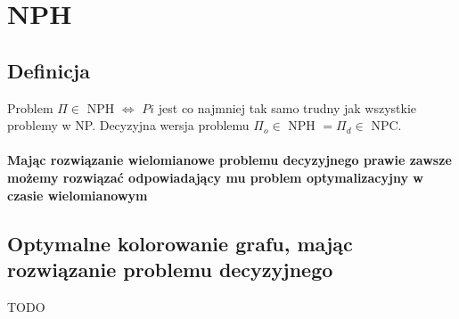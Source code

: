\documentclass{article}
\begin{document}
\section{NPH}
\subsection{Definicja}
Problem $\Pi \in$ NPH $\iff$ $Pi$ jest co najmniej tak samo trudny jak wszystkie problemy w NP.
Decyzyjna wersja problemu $\Pi_o \in$ NPH $= \Pi_d \in$ NPC.  \\\\
\textbf{Mając rozwiązanie wielomianowe problemu decyzyjnego prawie zawsze możemy
rozwiązać odpowiadający mu problem optymalizacyjny w czasie wielomianowym}

\subsection{Optymalne kolorowanie grafu, mając rozwiązanie problemu decyzyjnego}
TODO
\end{document}
